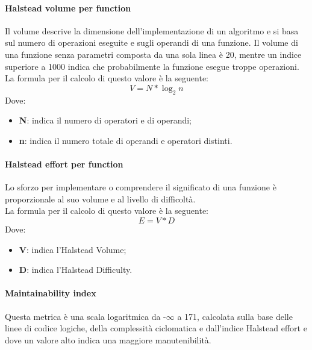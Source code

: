 \documentclass[../PianoDiQualifica.tex]{subfiles}
\begin{document}
			\paragraph{Halstead volume per function}
			Il volume descrive la dimensione dell'implementazione di un algoritmo e si basa sul numero di operazioni eseguite e sugli operandi di una funzione. Il volume di una funzione senza parametri composta da una sola linea è 20, mentre un indice superiore a 1000 indica che probabilmente la funzione esegue troppe operazioni.
				\\La formula per il calcolo di questo valore è la seguente:
				\begin{equation*}
					V = N * \log_{2}{n}
				\end{equation*}
				Dove:
				\begin{itemize}
					\item \textbf{N}: indica il numero di operatori e di operandi;
					\item \textbf{n}: indica il numero totale di operandi e operatori distinti.
				\end{itemize}

			\paragraph{Halstead effort per function}
				Lo sforzo per implementare o comprendere il significato di una funzione è proporzionale al suo volume e al livello di difficoltà.
				\\La formula per il calcolo di questo valore è la seguente:
				\begin{equation*}
					E = V * D
				\end{equation*}
				Dove:
				\begin{itemize}
					\item \textbf{V}: indica l'Halstead Volume;
					\item \textbf{D}: indica l'Halstead Difficulty.
				\end{itemize}
				
			\paragraph{Maintainability index}
			Questa metrica è una scala logaritmica da -$\infty$ a 171, calcolata sulla base delle linee di codice logiche, della complessità ciclomatica e dall'indice Halstead effort e dove un valore alto indica una maggiore manutenibilità.\\
				
\end{document}
